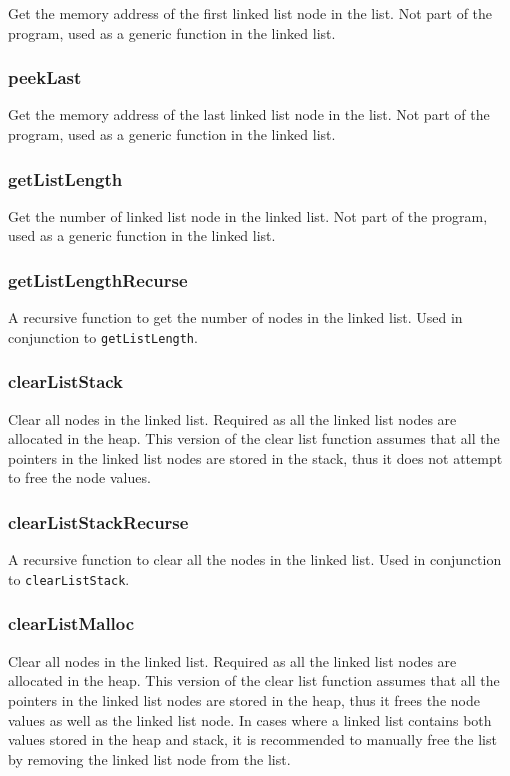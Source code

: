 \documentclass[a4paper, 12pt, titlepage]{article}
\newcommand{\code}[1]{\small\texttt{#1}\normalsize}
\begin{document}
Get the memory address of the first linked list node in the list. Not part of 
the program, used as a generic function in the linked list.

\subsubsection{peekLast}

Get the memory address of the last linked list node in the list. Not part of 
the program, used as a generic function in the linked list.

\subsubsection{getListLength}

Get the number of linked list node in the linked list. Not part of the 
program, used as a generic function in the linked list.

\subsubsection{getListLengthRecurse}

A recursive function to get the number of nodes in the linked list. Used in 
conjunction to \code{getListLength}.

\subsubsection{clearListStack}

Clear all nodes in the linked list. Required as all the linked list nodes are 
allocated in the heap. This version of the clear list function assumes that 
all the pointers in the linked list nodes are stored in the stack, thus it 
does not attempt to free the node values.

\subsubsection{clearListStackRecurse}

A recursive function to clear all the nodes in the linked list. Used in 
conjunction to \code{clearListStack}.

\subsubsection{clearListMalloc}

Clear all nodes in the linked list. Required as all the linked list nodes are 
allocated in the heap. This version of the clear list function assumes that 
all the pointers in the linked list nodes are stored in the heap, thus it 
frees the node values as well as the linked list node. In cases where a 
linked list contains both values stored in the heap and stack, it is 
recommended to manually free the list by removing the linked list node from 
the list.
\end{document}
